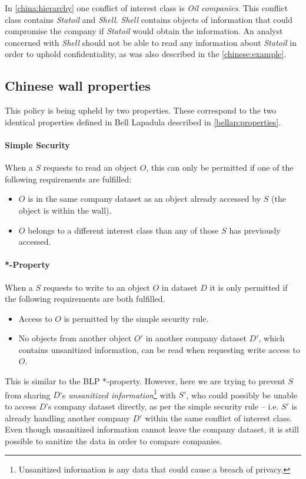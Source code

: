 In \cref{china:hierarchy} one conflict of interest class is \emph{Oil companies}.
This conflict class contains \emph{Statoil} and \emph{Shell}. 
\emph{Shell} contains objects of information that could compromise the company if \emph{Statoil} would obtain the information.
An analyst concerned with \emph{Shell} should not be able to read any information about \emph{Statoil} in order to uphold confidentiality, as was also described in the \cref{chinese:example}.

\subsection{Chinese wall properties}
This policy is being upheld by two properties.
These correspond to the two identical properties defined in Bell Lapadula described in \cref{bellap:properties}.

\paragraph{Simple Security}

When a \principal{} $S$ requests to read an object $O$, this can only be permitted if one of the following requirements are fulfilled:

\begin{itemize}
\item $O$ is in the same company dataset as an object already accessed by $S$ (the object is within the wall).
\item $O$ belongs to a different interest class than any of those $S$ has previously accessed.
\end{itemize}

\paragraph{*-Property}

When a \principal{} $S$ requests to write to an object $O$ in dataset $D$ it is only permitted if the following requirements are both fulfilled.

\begin{itemize}
\item Access to $O$ is permitted by the simple security rule.
\item No objects from another object $O'$ in another company dataset $D'$, which contains unsanitized information, can be read when requesting write access to $O$.
\end{itemize}

This is similar to the BLP *-property.
However, here we are trying to prevent \principal{} $S$ from sharing $D$'s \textit{unsanitized information}\footnote{Unsanitized information is any data that could cause a breach of privacy.} with \principal{} $S'$, who could possibly be unable to access $D$'s company dataset directly, as per the simple security rule -- i.e. $S'$ is already handling another company $D'$ within the same conflict of interest class.
Even though unsanitized information cannot leave the company dataset, it is still possible to sanitize the data in order to compare companies.

